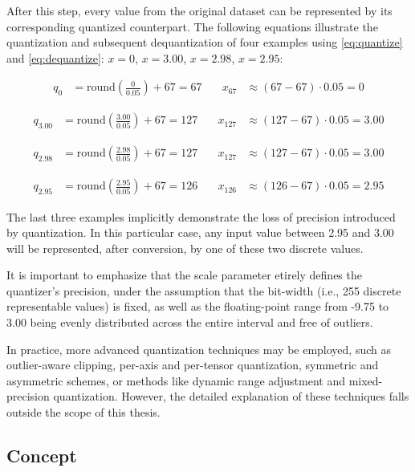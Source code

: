 {After this step, every value from the original dataset can be represented by its corresponding quantized counterpart. The following equations illustrate the quantization and subsequent dequantization of four examples using \ref{eq:quantize} and \ref{eq:dequantize}: \( x = 0 \), \( x = 3.00 \), \( x = 2.98 \), \( x = 2.95 \):

\begin{align*}
q_{0} &= \text{round}\left(\frac{0}{0.05} \right) + 67 = 67
& \quad
x_{67} &\approx \left( 67 - 67 \right) \cdot 0.05 = 0
\end{align*}

\begin{align*}
q_{3.00} &= \text{round}\left(\frac{3.00}{0.05} \right) + 67 = 127
& \quad
x_{127} &\approx \left( 127 - 67 \right) \cdot 0.05 = 3.00
\end{align*}

\begin{align*}
q_{2.98} &= \text{round}\left(\frac{2.98}{0.05} \right) + 67 = 127
& \quad
x_{127} &\approx \left( 127 - 67 \right) \cdot 0.05 = 3.00
\end{align*}

\begin{align*}
q_{2.95} &= \text{round}\left(\frac{2.95}{0.05} \right) + 67 = 126
& \quad
x_{126} &\approx \left( 126 - 67 \right) \cdot 0.05 = 2.95
\end{align*}

The last three examples implicitly 	demonstrate the loss of precision introduced by quantization. In this particular case, any input value between 2.95 and 3.00 will be represented, after conversion, by one of these two discrete values.

It is important to emphasize that the scale parameter etirely defines the quantizer's precision, under the assumption that the bit-width (i.e., 255 discrete representable values) is fixed, as well as the floating-point range from -9.75 to 3.00 being evenly distributed across the entire interval and free of outliers.

In practice, more advanced quantization techniques may be employed, such as outlier-aware clipping, per-axis and per-tensor quantization, symmetric and asymmetric schemes, or methods like dynamic range adjustment and mixed-precision quantization. However, the detailed explanation of these techniques falls outside the scope of this thesis.


\subsection{Concept}

}
